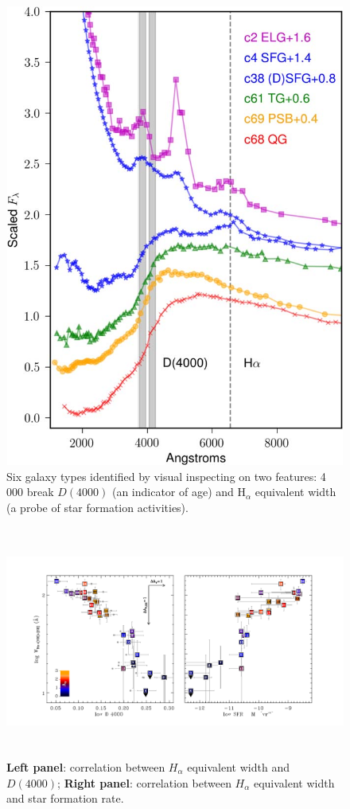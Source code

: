 \documentclass{ar-1col}
\begin{document}
\begin{figure}
    \includegraphics[width=5in, height=6in]{images/galaxy_types.png}
    \caption{Six galaxy types identified by visual inspecting on two features: 4\,000 break $ D(4000) $ (an indicator of age) and H$_\alpha$ equivalent width (a probe of star formation activities).}
    \label{fig:seds}
\end{figure}

\begin{figure}
    \includegraphics[width=6in, height=3in]{images/correlation_Ha_D4000.pdf}
    \caption{\textbf{Left panel}: correlation between $H_\alpha$ equivalent width and $D(4000)$; \textbf{Right panel}: correlation between $H_\alpha$ equivalent width and star formation rate.}
    \label{fig:correlation_kreik}
\end{figure}
\end{document}

